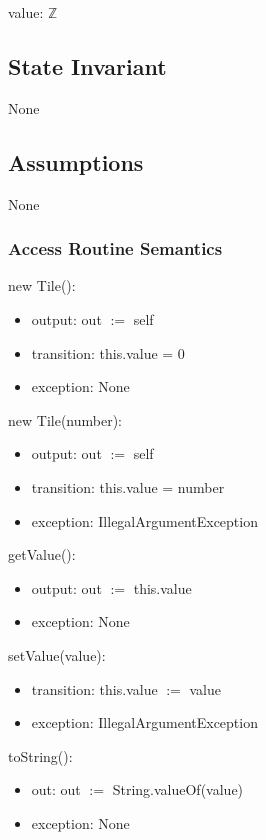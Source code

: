 \documentclass[12pt]{article}
\begin{document}
value: $\mathbb{Z}$

\subsection*{State Invariant}

None

\subsection*{Assumptions}

None

\subsubsection* {Access Routine Semantics}

new Tile():

\begin{itemize}
  \item output: out $:=$ self
  \item transition: this.value = 0
  \item exception: None
\end{itemize}

\noindent new Tile(number):

\begin{itemize}
  \item output: out $:=$ self
  \item transition: this.value = number
  \item exception: IllegalArgumentException
\end{itemize}

\noindent getValue():

\begin{itemize}
  \item output: out $:=$ this.value
  \item exception: None
\end{itemize}

\noindent setValue(value):
\begin{itemize}
  \item transition: this.value $:=$ value
  \item exception: IllegalArgumentException
\end{itemize}

\noindent toString():
\begin{itemize}
  \item out: out $:=$ String.valueOf(value)
  \item exception: None
\end{itemize}
\end{document}
